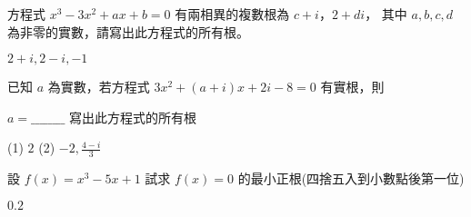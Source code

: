 \begin{QUESTIONS}
\begin{QUESTION}
\begin{QBODY}
        方程式 ${{x}^{3}}-3{{x}^{2}}+ax+b=0$ 有兩相異的複數根為 $c+i$，$2+di$，
        其中 $a,b,c,d$ 為非零的實數，請寫出此方程式的所有根。
    \end{QBODY}
    \begin{QFROMS}
    \end{QFROMS}
    \begin{QTAGS} \end{QTAGS}
    \begin{QANS}
        $2+i,2-i,-1$
    \end{QANS}
    \begin{QSOL}
    \end{QSOL}
    \begin{QEMPTYSPACE}
    \end{QEMPTYSPACE}
\end{QUESTION}
\begin{QUESTION}
    \begin{QBODY}
        已知 $a$ 為實數，若方程式 $3{{x}^{2}}+\left( a+i \right)x+2i-8=0$ 有實根，則
        \begin{SUBQLIST}
            \SUBQ $a=\_\_\_\_\_\_\_\_$
            \SUBQ 寫出此方程式的所有根
        \end{SUBQLIST}
    \end{QBODY}
    \begin{QFROMS}
    \end{QFROMS}
    \begin{QTAGS} \end{QTAGS}
    \begin{QANS}
        (1) $2$  (2)  $-2,\frac{4-i}{3}$
    \end{QANS}
    \begin{QSOL}
    \end{QSOL}
    \begin{QEMPTYSPACE}
    \end{QEMPTYSPACE}
\end{QUESTION}
\begin{QUESTION}
    \begin{QBODY}
        設 $f\left( x \right)={{x}^{3}}-5x+1$ 試求 $f\left( x \right)=0$ 的最小正根(四捨五入到小數點後第一位)        
    \end{QBODY}
    \begin{QFROMS}
    \end{QFROMS}
    \begin{QTAGS} \end{QTAGS}
    \begin{QANS}
        $0.2$

\end{QANS}
\end{QUESTION}
\end{QUESTIONS}

